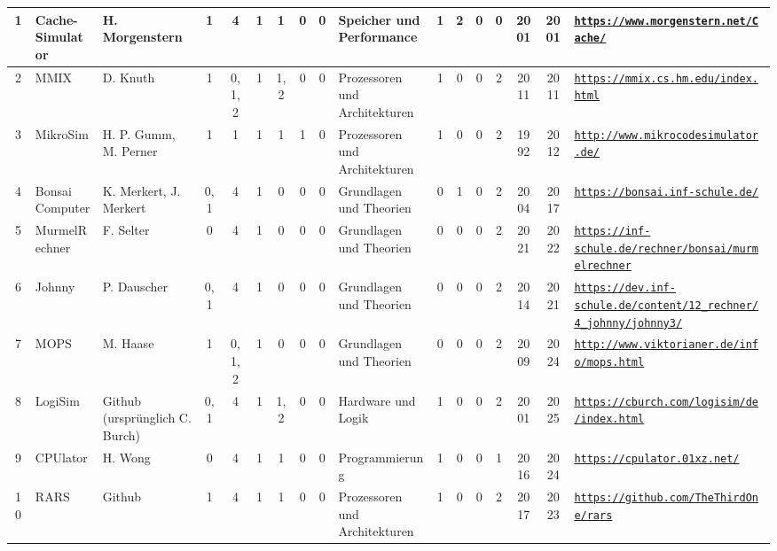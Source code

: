 \begin{landscape}
\begin{longtable}{|c|p{1cm}|p{1.3cm}|c|c|c|c|c|c|p{1.3cm}|c|c|c|c|c|c|p{2cm}|}
    1 & Cache-Simulator & H. Morgenstern & 1 & 4 & 1 & 1 & 0 & 0 & Speicher und Performance & 1 & 2 & 0 & 0 & 2001 & 2001 & \href{https://www.morgenstern.net/Cache/}{\nolinkurl{https://www.morgenstern.net/Cache/}} \\ \hline
    2 & MMIX & D. Knuth & 1 & 0,1,2 & 1 & 1,2 & 0 & 0 & Prozessoren und Architekturen & 1 & 0 & 0 & 2 & 2011 & 2011 & \href{https://mmix.cs.hm.edu/index.html}{\nolinkurl{https://mmix.cs.hm.edu/index.html}} \\ \hline
    3 & MikroSim & H. P. Gumm, M. Perner & 1 & 1 & 1 & 1 & 1 & 0 & Prozessoren und Architekturen & 1 & 0 & 0 & 2 & 1992 & 2012 & \href{http://www.mikrocodesimulator.de/}{\nolinkurl{http://www.mikrocodesimulator.de/}} \\ \hline
    4 & Bonsai Computer & K. Merkert, J. Merkert & 0,1 & 4 & 1 & 0 & 0 & 0 & Grundlagen und Theorien & 0 & 1 & 0 & 2 & 2004 & 2017 & \href{https://bonsai.inf-schule.de/}{\nolinkurl{https://bonsai.inf-schule.de/}} \\ \hline
    5 & MurmelRechner & F. Selter & 0 & 4 & 1 & 0 & 0 & 0 & Grundlagen und Theorien & 0 & 0 & 0 & 2 & 2021 & 2022 & \href{https://inf-schule.de/rechner/bonsai/murmelrechner}{\nolinkurl{https://inf-schule.de/rechner/bonsai/murmelrechner}} \\ \hline
    6 & Johnny & P. Dauscher & 0,1 & 4 & 1 & 0 & 0 & 0 & Grundlagen und Theorien & 0 & 0 & 0 & 2 & 2014 & 2021 & \href{https://dev.inf-schule.de/content/12\_rechner/4\_johnny/johnny3/}{\nolinkurl{https://dev.inf-schule.de/content/12\_rechner/4\_johnny/johnny3/}} \\ \hline
    7 & MOPS & M. Haase & 1 & 0,1,2 & 1 & 0 & 0 & 0 & Grundlagen und Theorien & 0 & 0 & 0 & 2 & 2009 & 2024 & \href{http://www.viktorianer.de/info/mops.html}{\nolinkurl{http://www.viktorianer.de/info/mops.html}} \\ \hline
    8 & LogiSim & Github (ursprünglich C. Burch) & 0,1 & 4 & 1 & 1,2 & 0 & 0 & Hardware und Logik & 1 & 0 & 0 & 2 & 2001 & 2025 & \href{https://cburch.com/logisim/de/index.html}{\nolinkurl{https://cburch.com/logisim/de/index.html}} \\ \hline
    9 & CPUlator & H. Wong & 0 & 4 & 1 & 1 & 0 & 0 & Programmierung & 1 & 0 & 0 & 1 & 2016 & 2024 & \href{https://cpulator.01xz.net/}{\nolinkurl{https://cpulator.01xz.net/}} \\ \hline
    10 & RARS & Github & 1 & 4 & 1 & 1 & 0 & 0 & Prozessoren und Architekturen & 1 & 0 & 0 & 2 & 2017 & 2023 & \href{https://github.com/TheThirdOne/rars}{\nolinkurl{https://github.com/TheThirdOne/rars}} \\ \hline

\end{longtable}
\end{landscape}
